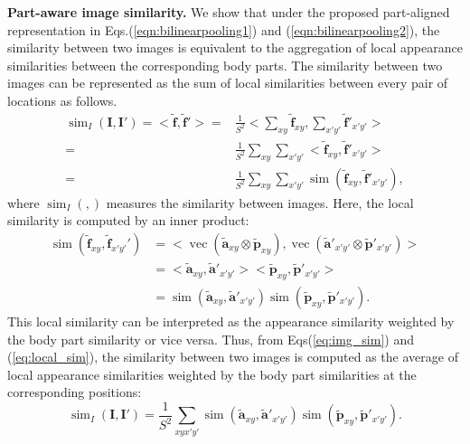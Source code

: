 \documentclass{llncs}
\begin{document}
\noindent\textbf{Part-aware image similarity.}
We show that under the proposed part-aligned representation in Eqs.(\ref{eqn:bilinearpooling1}) and (\ref{eqn:bilinearpooling2}), the similarity between two images is equivalent to the aggregation of local appearance similarities between the corresponding body parts. 
The similarity between two images can be represented as the sum of local similarities between every pair of locations as follows.
\begin{align}
\label{eq:img_sim}
\operatorname{sim}_I(\mathbf{I}, \mathbf{I}')
=<\tilde{\mathbf{f}}, \tilde{\mathbf{f}}'> \nonumber
=&\frac{1}{S^2}<\sum_{xy}\tilde{\mathbf{f}}_{xy}, \sum_{x'y'}\tilde{\mathbf{f}}'_{x'y'}> \nonumber \\
=&\frac{1}{S^2}\sum_{xy} \sum_{x'y'} <\tilde{\mathbf{f}}_{xy} , \tilde{\mathbf{f}}'_{x'y'} > \nonumber \\
= & \frac{1}{S^2}\sum_{xy} \sum_{x'y'}  \operatorname{sim}( \tilde{\mathbf{f}}_{xy}, \tilde{\mathbf{f}}'_{x'y'}),
\end{align}
where $\operatorname{sim}_I(,)$ measures the similarity between images.
Here, the local similarity is computed by an inner product:
\begin{align}
\label{eq:local_sim}
\operatorname{sim}(\tilde{\mathbf{f}}_{xy}, \tilde{\mathbf{f}}_{x'y'}')
&= <\operatorname{vec}(\tilde{\mathbf{a}}_{xy} \otimes \tilde{\mathbf{p}}_{xy}),
\operatorname{vec}(\tilde{\mathbf{a}}'_{x'y'}  \otimes\tilde{\mathbf{p}}'_{x'y'}) > \nonumber \\
&=<\tilde{\mathbf{a}}_{xy}, \tilde{\mathbf{a}}'_{x'y'}>
 <\tilde{\mathbf{p}}_{xy},\tilde{\mathbf{p}}'_{x'y'}> \nonumber \\
 &= \operatorname{sim}(\tilde{\mathbf{a}}_{xy}, \tilde{\mathbf{a}}'_{x'y'})
 \operatorname{sim}(\tilde{\mathbf{p}}_{xy}, \tilde{\mathbf{p}}'_{x'y'}).
\end{align}
This local similarity can be interpreted as the appearance similarity weighted by the body part similarity or vice versa.
Thus, from Eqs(\ref{eq:img_sim}) and (\ref{eq:local_sim}), the similarity between two images is computed as the average of local appearance similarities weighted by the body part similarities at the corresponding positions:
\begin{equation}
\operatorname{sim}_I(\mathbf{I}, \mathbf{I}') = \frac{1}{S^2}\sum_{xyx'y'}{ \operatorname{sim}(\tilde{\mathbf{a}}_{xy}, \tilde{\mathbf{a}}'_{x'y'})
 \operatorname{sim}(\tilde{\mathbf{p}}_{xy}, \tilde{\mathbf{p}}'_{x'y'})}. \nonumber
\end{equation}
\end{document}
